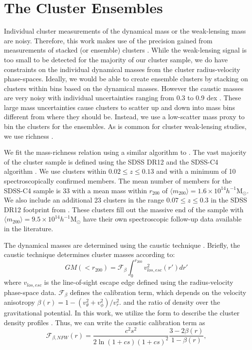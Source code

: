 \documentclass[apj]{emulateapj}
\begin{document}
\section{The Cluster Ensembles}

Individual cluster measurements of the dynamical mass or the weak-lensing mass are noisy. Therefore, this work makes use of the precision gained from measurements of stacked (or ensemble) clusters \citep{Rozo2011, Saro2013, Gifford2017}. While the weak-lensing signal is too small to be detected for the majority of our cluster sample, we do have constraints on the individual dynamical masses from the cluster radius-velocity phase-spaces. Ideally, we would be able to create ensemble clusters by stacking on clusters within bins based on the dynamical masses. However the caustic masses are very noisy with individual uncertainties ranging from 0.3 to 0.9 dex \citep{Gifford2013}. These large mass uncertainties cause clusters to scatter up and down into mass bins different from where they should be. Instead, we use a low-scatter mass proxy to bin the clusters for the ensembles. As is common for cluster weak-lensing studies, we use richness \citep{Rozo2011, Wiesner15, Saro15, Melchior17}. 

We fit the mass-richness relation using a similar algorithm to \citet{Andreon2010}. The vast majority of the cluster sample is defined using the SDSS DR12 and the SDSS-C4 algorithm \citep{DR12a,DR12b, Miller2005}. We use clusters within $0.02 \le z \le 0.13$ and with a minimum of 10 spectroscopically confirmed members. The mean number of members for the SDSS-C4 sample is 33 with a mean mass within $r_{200}$ of $\langle m_{200} \rangle = 1.6\times10^{14}h^{-1}$M$_{\odot}$. We also include an additional 23 clusters in the range $0.07 \le z \le 0.3$ in the SDSS DR12 footprint from \citet{Stark2017}. These clusters fill out the massive end of the sample with $\langle m_{200} \rangle = 9.5\times10^{14}h^{-1}$M$_{\odot}$ have their own spectroscopic follow-up data available in the literature.

The dynamical masses are determined using the caustic technique \citep{Gifford2013, Diaferio97, Diaferio99}. Briefly, the caustic technique determines cluster masses according to:
\begin{equation}
GM(<r_{200}) = \mathcal{F}_{\beta} \int^{r_{200}}_{0} v_{los,esc}^2(r') dr'
\label{eq:caustic_eq}
\end{equation}
where $v_{los,esc}$ is the line-of-sight escape edge defined using the radius-velocity phase-space data. $\mathcal{F}_{\beta}$ defines the calibration term, which depends on the velocity anisotropy  $\beta (r) = 1 - (v_{\theta}^2 + v_{\phi}^2) / v_{r}^{2}$. and the ratio of density over the gravitational potential. In this work, we utilize the \citet{NFW} form to describe the cluster density profiles \citep{Diaferio99, Gifford2017}. Thus, we can write the caustic calibration term as 
\begin{equation} \label{eq:avgfb_nfw}
\mathcal{F}_{\beta,NFW}(r) = \frac{c^{2} s^2}{2 \ln (1 + cs) (1+cs)^2} \frac{3-2\beta (r)}{1-\beta (r)},
\end{equation}
\end{document}
